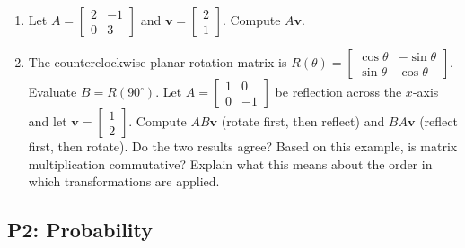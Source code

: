 \documentclass[11pt]{article}
\newenvironment{studentanswer}[1]
  {\par\noindent\begin{minipage}[t][#1][t]{\linewidth}\ignorespaces}
  {\end{minipage}\par}
\begin{document}
\begin{enumerate}[label=\alph*)]

\item Let $A = \begin{bmatrix} 2 & -1 \\ 0 & 3 \end{bmatrix}$ and $\mathbf{v} = \begin{bmatrix} 2 \\ 1 \end{bmatrix}$. Compute $A\mathbf{v}$.

\begin{studentanswer}{4cm}
\end{studentanswer}

\item The counterclockwise planar rotation matrix is
$R(\theta)=\begin{bmatrix}\cos\theta&-\sin\theta\\
\sin\theta&\cos\theta\end{bmatrix}$. Evaluate $B=R(90^\circ)$.
Let $A = \begin{bmatrix} 1 & 0 \\ 0 & -1 \end{bmatrix}$ be reflection
across the $x$-axis and let $\mathbf{v} = \begin{bmatrix} 1 \\ 2\end{bmatrix}$.
Compute $AB\mathbf{v}$ (rotate first, then reflect) and $BA\mathbf{v}$
(reflect first, then rotate). Do the two results agree? Based on this
example, is matrix multiplication commutative? Explain what this means about
the order in which transformations are applied.

\begin{studentanswer}{6cm}
\end{studentanswer}

\end{enumerate}

\newpage
\subsection*{P2: Probability}
\end{document}
